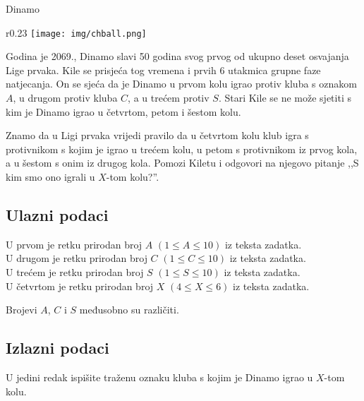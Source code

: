 \begin{statement}[
  problempoints=20,
  timelimit=1 sekunda,
  memorylimit=512 MiB,
]{Dinamo}


\setlength\intextsep{-0.1cm}
\begin{wrapfigure}[8]{r}{0.23\textwidth}
\centering
\texttt{[image: img/chball.png]}
\end{wrapfigure}

Godina je 2069., Dinamo slavi 50 godina svog prvog od ukupno deset osvajanja
Lige prvaka. Kile se prisjeća tog vremena i prvih 6 utakmica grupne faze
natjecanja. On se sjeća da je Dinamo u prvom kolu igrao protiv kluba s oznakom
$A$, u drugom protiv kluba $C$, a u trećem protiv $S$. Stari Kile se ne može
sjetiti s kim je Dinamo igrao u četvrtom, petom i šestom kolu.

Znamo da u Ligi prvaka vrijedi pravilo da u četvrtom kolu klub igra s
protivnikom s kojim je igrao u trećem kolu, u petom s protivnikom iz prvog kola,
a u šestom s onim iz drugog kola. Pomozi Kiletu i odgovori na njegovo pitanje
,,S kim smo ono igrali u $X$-tom kolu?''.

\subsection*{Ulazni podaci}
U prvom je retku prirodan broj $A$ $(1 \le A \le 10)$ iz teksta zadatka. \\
U drugom je retku prirodan broj $C$ $(1 \le C \le 10)$ iz teksta zadatka. \\
U trećem je retku prirodan broj $S$ $(1 \le S \le 10)$ iz teksta zadatka. \\
U četvrtom je retku prirodan broj $X$ $(4 \le X \le 6)$ iz teksta zadatka.

Brojevi $A$, $C$ i $S$ međusobno su različiti.

\subsection*{Izlazni podaci}
U jedini redak ispišite traženu oznaku kluba s kojim je Dinamo igrao u $X$-tom
kolu.



\end{statement}
